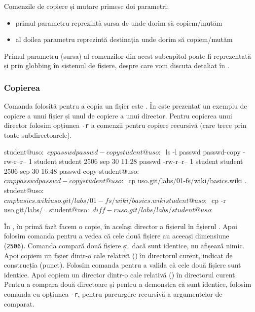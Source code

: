 Comenzile de copiere și mutare primesc doi parametri:

\begin{itemize}
  \item primul parametru reprezintă sursa de unde dorim să copiem/mutăm
  \item al doilea parametru reprezintă destinația unde dorim să copiem/mutăm
\end{itemize}

\begin{note}[Observație]
Primul parametru (sursa) al comenzilor din acest subcapitol poate fi reprezentată și prin globbing în sistemul de fișiere, despre care vom discuta detaliat în .
\end{note}

\subsubsection{Copierea}
\label{sec:fs:cp}

Comanda folosită pentru a copia un fișier este . În  este prezentat un exemplu de copiere a unui fișier și unul de copiere a unui director. Pentru copierea unui director folosim opțiunea \texttt{-r} a comenzii  pentru copiere recursivă (care trece prin toate subdirectoarele).

\begin{screen}[caption={Copierea fișierelor și directoarelor},label={lst:fs:cp}]
student@uso:~$ cp passwd passwd-copy
student@uso:~$ ls -l passwd passwd-copy
-rw-r--r-- 1 student student 2506 sep 30 11:28 passwd
-rw-r--r-- 1 student student 2506 sep 30 16:48 passwd-copy
student@uso:~$ cmp passwd passwd-copy
student@uso:~$ cp uso.git/labs/01-fs/wiki/basics.wiki .
student@uso:~$ cmp basics.wiki uso.git/labs/01-fs/wiki/basics.wiki
student@uso:~$ cp -r uso.git/labs/ .
student@uso:~$ diff -r uso.git/labs/ labs/
student@uso:~$
\end{screen}

În , în primă fază facem o copie, în același director a fișierul  în fișierul . Apoi folosim comanda  pentru a vedea că cele două fișiere au aceeași dimensiune (\texttt{2506}). Comanda  compară două fișiere și, dacă sunt identice, nu afișează nimic. Apoi copiem un fișier dintr-o cale relativă () în directorul curent, indicat de construcția  (punct). Folosim comanda  pentru a valida că cele două fișiere sunt identice. Apoi copiem un director dintr-o cale relativă () în directorul curent. Pentru a compara două directoare și pentru a demonstra că sunt identice, folosim comanda  cu opțiunea \texttt{-r}, pentru parcurgere recursivă a argumentelor de comparat.

